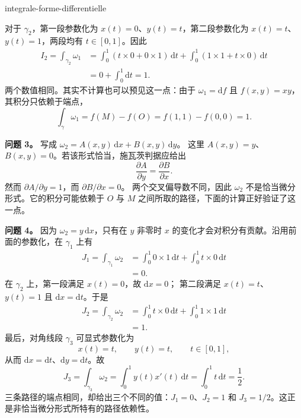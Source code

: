 \begin{exo}[沿路径积分微分形式]{integrale-forme-differentielle}
\begin{solution}
对于 $\gamma_2$，第一段参数化为 $x(t)=0$、$y(t)=t$，第二段参数化为
$x(t)=t$、$y(t)=1$，两段均有 $t\in[0,1]$。因此
\[
\begin{aligned}
I_2
= \int_{\gamma_2}\omega_1
&= \int_0^1\left(t\times 0+0\times 1\right)\,\mathrm{d}t
 + \int_0^1\left(1\times 1+t\times 0\right)\,\mathrm{d}t \\
&= 0+\int_0^1\mathrm{d}t = 1.
\end{aligned}
\]
两个数值相同。其实不计算也可以预见这一点：由于 $\omega_1=\mathrm{d}f$ 且
$f(x,y)=xy$，其积分只依赖于端点，
\[
\int_\gamma\omega_1=f(M)-f(O)=f(1,1)-f(0,0)=1.
\]

\textbf{问题 3。} 写成 $\omega_2=A(x,y)\,\mathrm{d}x+B(x,y)\,\mathrm{d}y$。
这里 $A(x,y)=y$、$B(x,y)=0$。若该形式恰当，施瓦茨判据应给出
\[
\frac{\partial A}{\partial y}=\frac{\partial B}{\partial x}.
\]
然而 $\partial A/\partial y=1$，而 $\partial B/\partial x=0$。
两个交叉偏导数不同，因此 $\omega_2$ 不是恰当微分形式。它的积分可能依赖于
$O$ 与 $M$ 之间所取的路径，下面的计算正好验证了这一点。

\textbf{问题 4。} 因为 $\omega_2=y\,\mathrm{d}x$，只有在 $y$ 非零时
$x$ 的变化才会对积分有贡献。沿用前面的参数化，在 $\gamma_1$ 上有
\[
\begin{aligned}
J_1
=\int_{\gamma_1}\omega_2
&=\int_0^1 0\times 1\,\mathrm{d}t
  +\int_0^1 t\times 0\,\mathrm{d}t \\
&=0.
\end{aligned}
\]
在 $\gamma_2$ 上，第一段满足 $x(t)=0$，故 $\mathrm{d}x=0$；
第二段满足 $x(t)=t$、$y(t)=1$ 且 $\mathrm{d}x=\mathrm{d}t$。于是
\[
\begin{aligned}
J_2
=\int_{\gamma_2}\omega_2
&=\int_0^1 t\times 0\,\mathrm{d}t
  +\int_0^1 1\times 1\,\mathrm{d}t \\
&=1.
\end{aligned}
\]
最后，对角线段 $\gamma_3$ 可显式参数化为
\[
x(t)=t,\qquad y(t)=t,\qquad t\in[0,1],
\]
从而 $\mathrm{d}x=\mathrm{d}t$、$\mathrm{d}y=\mathrm{d}t$。故
\[
J_3
=\int_{\gamma_3}\omega_2
=\int_0^1 y(t)x'(t)\,\mathrm{d}t
=\int_0^1 t\,\mathrm{d}t
=\frac12.
\]
三条路径的端点相同，却给出三个不同的值：$J_1=0$、$J_2=1$ 和
$J_3=1/2$。这正是非恰当微分形式所特有的路径依赖性。
\end{solution}
\end{exo}

